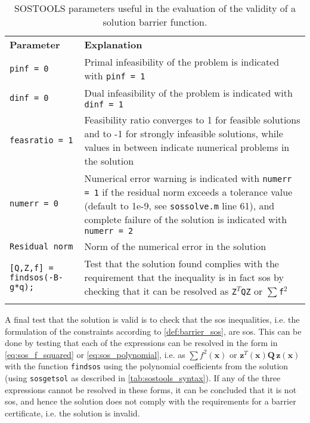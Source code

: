 \begin{table}[H]
	\begin{tabularx}{\textwidth}{p{3.5cm} X}
		\rowcolor{HeaderBlue}
	\textbf{Parameter} & \textbf{Explanation}\\	
		\texttt{pinf = 0} & Primal infeasibility of the problem is indicated with \texttt{pinf = 1}\\
		\rowcolor{textBlue}
		\texttt{dinf = 0} & Dual infeasibility of the problem is indicated with \texttt{dinf = 1}\\
		\texttt{feasratio = 1} & Feasibility ratio converges to 1 for feasible solutions and to -1 for strongly infeasible solutions, while values in between indicate numerical problems in the solution\\
		\rowcolor{textBlue}
		\texttt{numerr = 0} & Numerical error warning is indicated with \texttt{numerr = 1} if the residual norm exceeds a tolerance value (default to 1e-9, see \texttt{sossolve.m} line 61), and complete failure of the solution is indicated with \texttt{numerr = 2}\\
		\texttt{Residual norm} & Norm of the numerical error in the solution \\
		\rowcolor{textBlue}
		\texttt{[Q,Z,f] = findsos(-B-g*q);} &  Test that the solution found complies with the requirement that the inequality is in fact \gls{sos} by checking that it can be resolved as \texttt{Z}$^T$\texttt{QZ} or $\sum$\texttt{f}$^2$\\
		\rowcolor{textBlue}
	\end{tabularx}
	\caption{SOSTOOLS parameters useful in the evaluation of the validity of a solution  barrier function.}
	\label{tab:sostools_evaluation}
\end{table}

A final test that the solution is valid is to check that the \gls{sos} inequalities, i.e. the formulation of the constraints according to \autoref{def:barrier_sos}, are \gls{sos}. This can be done by testing that each of the expressions can be resolved in the form in \autoref{eq:sos_f_squared} or \autoref{eq:sos_polynomial}, i.e. as $\sum f^2(\mathbf{x})$ or $\mathbf{z}^T(\mathbf{x})\mathbf{Q}\,\mathbf{z}(\mathbf{x})$ with the function \texttt{findsos} using the polynomial coefficients from the solution (using \texttt{sosgetsol} as described in \autoref{tab:sostools_syntax}). If any of the three expressions cannot be resolved in these forms, it can be concluded that it is not \gls{sos}, and hence the solution does not comply with the requirements for a barrier certificate, i.e. the solution is invalid.